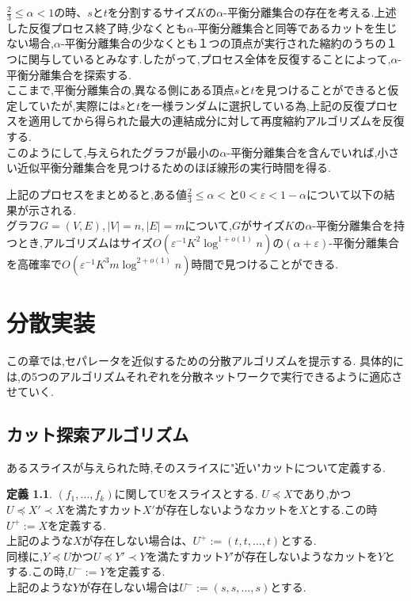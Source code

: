\documentclass{thesis}
\theoremstyle{definition}
\newtheorem{definition}{定義}
\begin{document}
$\frac{2}{3} \leq \alpha < 1$の時、$s$と$t$を分割するサイズ$K$の$\alpha$-平衡分離集合の存在を考える.上述した反復プロセス終了時,少なくとも$\alpha$-平衡分離集合と同等であるカットを生じない場合,$\alpha$-平衡分離集合の少なくとも１つの頂点が実行された縮約のうちの１つに関与しているとみなす.したがって,プロセス全体を反復することによって,$\alpha$-平衡分離集合を探索する.\\
ここまで,平衡分離集合の,異なる側にある頂点$s$と$t$を見つけることができると仮定していたが,実際には$s$と$t$を一様ランダムに選択している為,上記の反復プロセスを適用してから得られた最大の連結成分に対して再度縮約アルゴリズムを反復する.\\
このようにして,与えられたグラフが最小の$\alpha$-平衡分離集合を含んでいれば,小さい近似平衡分離集合を見つけるためのほぼ線形の実行時間を得る.\par

上記のプロセスをまとめると,ある値$\frac{2}{3} \leq \alpha <$と$0 < \varepsilon <1-\alpha$について以下の結果が示される.\\
グラフ$G=(V,E),|V| = n,|E| = m$について,$G$がサイズ$K$の$\alpha$-平衡分離集合を持つとき,アルゴリズムはサイズ$O(\varepsilon^{-1} K^2 \log^{1+o(1)}n)$の$(\alpha + \varepsilon)$-平衡分離集合を高確率で$O(\varepsilon^{-1}K^3m\log^{2+o(1)}n)$時間で見つけることができる.

\chapter{分散実装}
この章では,セパレータを近似するための分散アルゴリズムを提示する.
具体的には,\cite{brandt2017approximating}の5つのアルゴリズムそれぞれを分散ネットワークで実行できるように適応させていく.

\section{カット探索アルゴリズム}
あるスライスが与えられた時,そのスライスに"近い"カットについて定義する.

\begin{definition}
    $(f_1, \dots ,f_k)$に関してUをスライスとする.
    $U\preceq X$であり,かつ$U\preceq X'\prec X$を満たすカット$X'$が存在しないようなカットを$X$とする.この時$U^+:=X$を定義する.\\
    上記のような$X$が存在しない場合は、$U^+:=(t,t,\dots,t)$とする.\\
    同様に,$Y\preceq U$かつ$U\preceq Y'\prec Y$を満たすカット$Y'$が存在しないようなカットを$Y$とする.この時,$U^-:=Y$を定義する.\\
    上記のような$Y$が存在しない場合は$U^-:=(s,s,\dots,s)$とする. 
\end{definition}
\end{document}

